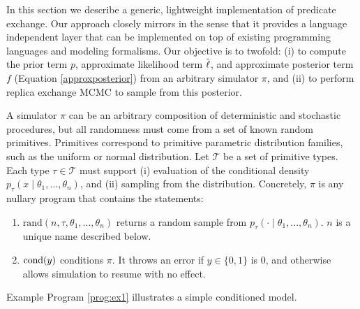 

In this section we describe a generic, lightweight implementation of predicate exchange.
Our approach closely mirrors \citep{wingate2011lightweight, milch20071} in the sense that it provides a language independent layer that can be implemented on top of existing programming languages and modeling formalisms.
Our objective is to twofold: (i) to compute the prior term $p$, approximate likelihood term $\tilde{\operatorname{\ell}}$, and approximate posterior term $f$ (Equation \ref{approxposterior}) from an arbitrary simulator $\pi$, and (ii) to perform replica exchange MCMC to sample from this posterior.

A simulator $\pi$ can be an arbitrary composition of deterministic and stochastic procedures, but all randomness must come from a set of known random primitives.
Primitives correspond to primitive parametric distribution families, such as the uniform or normal distribution.
Let $\mathcal{T}$ be a set of primitive types.
Each type $\tau \in \mathcal{T}$ must support (i) evaluation of the conditional density $p_\tau(x \mid \theta_1, ..., \theta_n)$, and (ii) sampling from the distribution.
Concretely, $\pi$ is any nullary program that contains the statements:

\begin{enumerate}
  \item $\textrm{rand}(n, \tau, \theta_1, ...,\theta_n)$ returns a random sample from $p_\tau(\cdot \mid \theta_1, ..., \theta_n)$.  $n$ is a unique name described below.
  \item $\operatorname{cond}(y)$ conditions $\pi$.  It throws an error if $y \in \{0, 1\}$ is 0, and otherwise allows simulation to resume with no effect.
\end{enumerate}

Example Program \ref{prog:ex1} illustrates a simple conditioned model.

